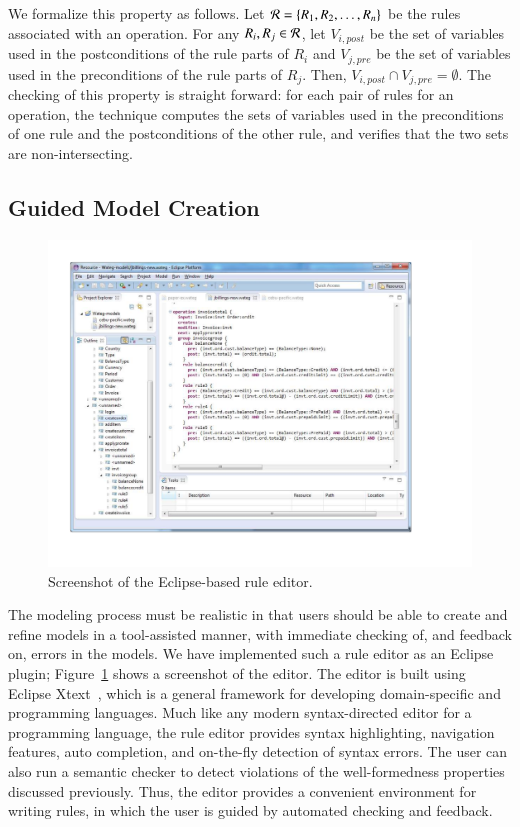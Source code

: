 We formalize this property as follows. Let ${\cal R} = \{R_1, R_2, \ldots,
R_n\}$ be the rules associated with an operation. For any $R_i, R_j \in {\cal
  R}$, let $V_{i, \mathit{post}}$ be the set of variables used in the
postconditions of the rule parts of $R_i$ and $V_{j, \mathit{pre}}$ be the set
of variables used in the preconditions of the rule parts of $R_j$. Then, $V_{i,
  \mathit{post}} \cap V_{j, \mathit{pre}} = \emptyset$. The checking of this
property is straight forward: for each pair of rules for an operation, the
technique computes the sets of variables used in the preconditions of one rule
and the postconditions of the other rule, and verifies that the two sets are
non-intersecting.

\subsection{Guided Model Creation}

\begin{figure}[t]
\centering
\includegraphics[trim=43 65 114 36,clip,width=\columnwidth]{figs/rule-editor.pdf}
\vspace*{-13pt}
\caption{Screenshot of the Eclipse-based rule editor.}
\vspace*{-0pt}
\label{fig:rule-editor}
\end{figure}

The modeling process must be realistic in that users should be able to create
and refine models in a tool-assisted manner, with immediate checking of, and
feedback on, errors in the models.  We have implemented such a rule editor as an
Eclipse plugin; Figure~\ref{fig:rule-editor} shows a screenshot of the
editor. The editor is built using Eclipse Xtext~\cite{xtext}, which is a general
framework for developing domain-specific and programming languages. Much like
any modern syntax-directed editor for a programming language, the rule editor
provides syntax highlighting, navigation features, auto completion, and
on-the-fly detection of syntax errors.  The user can also run a semantic checker
to detect violations of the well-formedness properties discussed
previously. Thus, the editor provides a convenient environment for writing
rules, in which the user is guided by automated checking and feedback.
